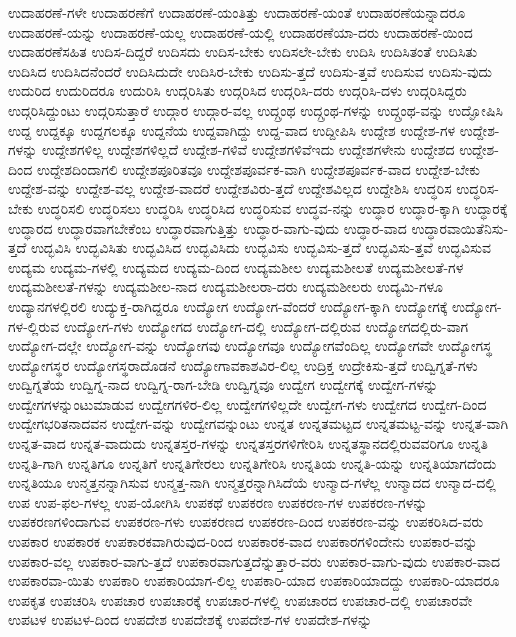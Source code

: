 {ಉದಾಹರಣೆ-ಗಳೇ
ಉದಾಹರಣೆಗೆ
ಉದಾಹರಣೆ-ಯಂತಿತ್ತು
ಉದಾಹರಣೆ-ಯಂತೆ
ಉದಾಹರಣೆಯನ್ನಾದರೂ
ಉದಾಹರಣೆ-ಯನ್ನು
ಉದಾಹರಣೆ-ಯಲ್ಲ
ಉದಾಹರಣೆ-ಯಲ್ಲಿ
ಉದಾಹರಣೆಯಾ-ದರು
ಉದಾಹರಣೆ-ಯಿಂದ
ಉದಾಹರಣೆಸಹಿತ
ಉದಿಸ-ದಿದ್ದರೆ
ಉದಿಸದು
ಉದಿಸ-ಬೇಕು
ಉದಿಸಲೇ-ಬೇಕು
ಉದಿಸಿ
ಉದಿಸಿತಂತೆ
ಉದಿಸಿತು
ಉದಿಸಿದ
ಉದಿಸಿದನೆಂದರೆ
ಉದಿಸಿದುದೇ
ಉದಿಸಿರ-ಬೇಕು
ಉದಿಸು-ತ್ತದೆ
ಉದಿಸು-ತ್ತವೆ
ಉದಿಸುವ
ಉದಿಸು-ವುದು
ಉದುರಿದ
ಉದುರಿದರೂ
ಉದುರಿಸಿ
ಉದ್ಗರಿಸಿತು
ಉದ್ಗರಿಸಿದ
ಉದ್ಗರಿಸಿ-ದರು
ಉದ್ಗರಿಸಿ-ದಳು
ಉದ್ಗರಿಸಿದ್ದರು
ಉದ್ಗರಿಸಿದ್ದುಂಟು
ಉದ್ಗರಿಸುತ್ತಾರೆ
ಉದ್ಗಾರ
ಉದ್ಗಾರ-ವಲ್ಲ
ಉದ್ಗ್ರಂಥ
ಉದ್ಗ್ರಂಥ-ಗಳನ್ನು
ಉದ್ಗ್ರಂಥ-ವನ್ನು
ಉದ್ಘೋಷಿಸಿ
ಉದ್ದ
ಉದ್ದಕ್ಕೂ
ಉದ್ದಗಲಕ್ಕೂ
ಉದ್ದನೆಯ
ಉದ್ದವಾಗಿದ್ದು
ಉದ್ದ-ವಾದ
ಉದ್ದೀಪಿಸಿ
ಉದ್ದೇಶ
ಉದ್ದೇಶ-ಗಳ
ಉದ್ದೇಶ-ಗಳನ್ನು
ಉದ್ದೇಶಗಳಿಲ್ಲ
ಉದ್ದೇಶಗಳಿಲ್ಲದೆ
ಉದ್ದೇಶ-ಗಳಿವೆ
ಉದ್ದೇಶಗಳಿವೆಇದು
ಉದ್ದೇಶಗಳೇನು
ಉದ್ದೇಶದ
ಉದ್ದೇಶ-ದಿಂದ
ಉದ್ದೇಶದಿಂದಾಗಲಿ
ಉದ್ದೇಶಪೂರಿತವೂ
ಉದ್ದೇಶಪೂರ್ವಕ-ವಾಗಿ
ಉದ್ದೇಶಪೂರ್ವಕ-ವಾದ
ಉದ್ದೇಶ-ಬೇಕು
ಉದ್ದೇಶ-ವನ್ನು
ಉದ್ದೇಶ-ವಲ್ಲ
ಉದ್ದೇಶ-ವಾದರೆ
ಉದ್ದೇಶವಿರು-ತ್ತದೆ
ಉದ್ದೇಶವಿಲ್ಲದ
ಉದ್ದೇಶಿಸಿ
ಉದ್ಧರಿಸ
ಉದ್ಧರಿಸ-ಬೇಕು
ಉದ್ಧರಿಸಲಿ
ಉದ್ಧರಿಸಲು
ಉದ್ಧರಿಸಿ
ಉದ್ಧರಿಸಿದ
ಉದ್ಧರಿಸುವ
ಉದ್ಧವ-ನನ್ನು
ಉದ್ಧಾರ
ಉದ್ಧಾರ-ಕ್ಕಾಗಿ
ಉದ್ಧಾರಕ್ಕೆ
ಉದ್ಧಾರದ
ಉದ್ಧಾರವಾಗಬೇಕೆಂಬ
ಉದ್ಧಾರವಾಗುತ್ತಿತ್ತು
ಉದ್ಧಾರ-ವಾಗು-ವುದು
ಉದ್ಧಾರ-ವಾದ
ಉದ್ಧಾರವಾಯಿತೆನಿಸು-ತ್ತದೆ
ಉದ್ಭವಿಸಿ
ಉದ್ಭವಿಸಿತು
ಉದ್ಭವಿಸಿದ
ಉದ್ಭವಿಸಿದು
ಉದ್ಭವಿಸು
ಉದ್ಭವಿಸು-ತ್ತದೆ
ಉದ್ಭವಿಸು-ತ್ತವೆ
ಉದ್ಭವಿಸುವ
ಉದ್ಯಮ
ಉದ್ಯಮ-ಗಳಲ್ಲಿ
ಉದ್ಯಮದ
ಉದ್ಯಮ-ದಿಂದ
ಉದ್ಯಮಶೀಲ
ಉದ್ಯಮಶೀಲತೆ
ಉದ್ಯಮಶೀಲತೆ-ಗಳ
ಉದ್ಯಮಶೀಲತೆ-ಗಳನ್ನು
ಉದ್ಯಮಶೀಲ-ನಾದ
ಉದ್ಯಮಶೀಲರಾ-ದರು
ಉದ್ಯಮಶೀಲರು
ಉದ್ಯಮಿ-ಗಳೂ
ಉದ್ಯಾನಗಳಲ್ಲಿರಲಿ
ಉದ್ಯುಕ್ತ-ರಾಗಿದ್ದರೂ
ಉದ್ಯೋಗ
ಉದ್ಯೋಗ-ವೆಂದರೆ
ಉದ್ಯೋಗ-ಕ್ಕಾಗಿ
ಉದ್ಯೋಗಕ್ಕೆ
ಉದ್ಯೋಗ-ಗಳ-ಲ್ಲಿರುವ
ಉದ್ಯೋಗ-ಗಳು
ಉದ್ಯೋಗದ
ಉದ್ಯೋಗ-ದಲ್ಲಿ
ಉದ್ಯೋಗ-ದಲ್ಲಿರುವ
ಉದ್ಯೋಗದಲ್ಲಿರು-ವಾಗ
ಉದ್ಯೋಗ-ದಲ್ಲೇ
ಉದ್ಯೋಗ-ವನ್ನು
ಉದ್ಯೋಗವು
ಉದ್ಯೋಗವೂ
ಉದ್ಯೋಗವೆಂದಿಲ್ಲ
ಉದ್ಯೋಗವೇ
ಉದ್ಯೋಗಸ್ಥ
ಉದ್ಯೋಗಸ್ಥರ
ಉದ್ಯೋಗಸ್ಥರಾದೊಡನೆ
ಉದ್ಯೋಗಾವಕಾಶವಿರ-ಲಿಲ್ಲ
ಉದ್ರಿಕ್ತ
ಉದ್ರೇಕಿಸು-ತ್ತದೆ
ಉದ್ವಿಗ್ನತೆ-ಗಳು
ಉದ್ವಿಗ್ನತೆಯ
ಉದ್ವಿಗ್ನ-ನಾದ
ಉದ್ವಿಗ್ನ-ರಾಗ-ಬೇಡಿ
ಉದ್ವಿಗ್ನವೂ
ಉದ್ವೇಗ
ಉದ್ವೇಗಕ್ಕೆ
ಉದ್ವೇಗ-ಗಳನ್ನು
ಉದ್ವೇಗಗಳನ್ನುಂಟುಮಾಡುವ
ಉದ್ವೇಗಗಳಿರ-ಲಿಲ್ಲ
ಉದ್ವೇಗಗಳಿಲ್ಲದೇ
ಉದ್ವೇಗ-ಗಳು
ಉದ್ವೇಗದ
ಉದ್ವೇಗ-ದಿಂದ
ಉದ್ವೇಗಭರಿತನಾದವನ
ಉದ್ವೇಗ-ವನ್ನು
ಉದ್ವೇಗವನ್ನುಂಟು
ಉನ್ನತ
ಉನ್ನತಮಟ್ಟದ
ಉನ್ನತಮಟ್ಟ-ವನ್ನು
ಉನ್ನತ-ವಾಗಿ
ಉನ್ನತ-ವಾದ
ಉನ್ನತ-ವಾದುದು
ಉನ್ನತಸ್ತರ-ಗಳನ್ನು
ಉನ್ನತಸ್ತರಗಳಿಗೇರಿಸಿ
ಉನ್ನತಸ್ಥಾನದಲ್ಲಿರುವವರಿಗೂ
ಉನ್ನತಿ
ಉನ್ನತಿ-ಗಾಗಿ
ಉನ್ನತಿಗೂ
ಉನ್ನತಿಗೆ
ಉನ್ನತಿಗೇರಲು
ಉನ್ನತಿಗೇರಿಸಿ
ಉನ್ನತಿಯ
ಉನ್ನತಿ-ಯನ್ನು
ಉನ್ನತಿಯಾಗದೆಂದು
ಉನ್ನತಿಯೂ
ಉನ್ಮತ್ತನನ್ನಾಗಿಸುವ
ಉನ್ಮತ್ತ-ನಾಗಿ
ಉನ್ಮತ್ತರನ್ನಾಗಿಸಿದೆಯೆ
ಉನ್ಮಾದ-ಗಳೆಲ್ಲ
ಉನ್ಮಾದದ
ಉನ್ಮಾದ-ದಲ್ಲಿ
ಉಪ
ಉಪ-ಫಲ-ಗಳಲ್ಲ
ಉಪ-ಯೋಗಿಸಿ
ಉಪಕಥೆ
ಉಪಕರಣ
ಉಪಕರಣ-ಗಳ
ಉಪಕರಣ-ಗಳನ್ನು
ಉಪಕರಣಗಳಿಂದಾಗುವ
ಉಪಕರಣ-ಗಳು
ಉಪಕರಣದ
ಉಪಕರಣ-ದಿಂದ
ಉಪಕರಣ-ವನ್ನು
ಉಪಕರಿಸಿದ-ವರು
ಉಪಕಾರ
ಉಪಕಾರಕ
ಉಪಕಾರಕವಾಗಿರುವುದ-ರಿಂದ
ಉಪಕಾರಕ-ವಾದ
ಉಪಕಾರಗಳಿಂದೇನು
ಉಪಕಾರ-ವನ್ನು
ಉಪಕಾರ-ವಲ್ಲ
ಉಪಕಾರ-ವಾಗು-ತ್ತದೆ
ಉಪಕಾರವಾಗುತ್ತದೆನ್ನುತ್ತಾರ-ವರು
ಉಪಕಾರ-ವಾಗು-ವುದು
ಉಪಕಾರ-ವಾದ
ಉಪಕಾರವಾ-ಯಿತು
ಉಪಕಾರಿ
ಉಪಕಾರಿಯಾಗ-ಲಿಲ್ಲ
ಉಪಕಾರಿ-ಯಾದ
ಉಪಕಾರಿಯಾದದ್ದು
ಉಪಕಾರಿ-ಯಾದರೂ
ಉಪಕೃತ
ಉಪಚರಿಸಿ
ಉಪಚಾರ
ಉಪಚಾರಕ್ಕೆ
ಉಪಚಾರ-ಗಳಲ್ಲಿ
ಉಪಚಾರದ
ಉಪಚಾರ-ದಲ್ಲಿ
ಉಪಚಾರವೇ
ಉಪಟಳ
ಉಪಟಳ-ದಿಂದ
ಉಪದೇಶ
ಉಪದೇಶಕ್ಕೆ
ಉಪದೇಶ-ಗಳ
ಉಪದೇಶ-ಗಳನ್ನು
}

